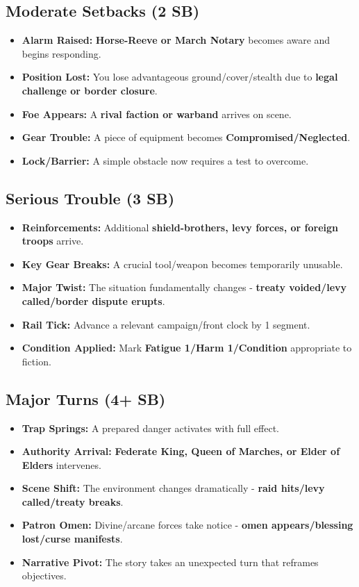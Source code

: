 \subsection*{Moderate Setbacks (2 SB)}
\begin{itemize}
\item \textbf{Alarm Raised:} \textbf{Horse-Reeve or March Notary} becomes aware and begins responding.
\item \textbf{Position Lost:} You lose advantageous ground/cover/stealth due to \textbf{legal challenge or border closure}.
\item \textbf{Foe Appears:} A \textbf{rival faction or warband} arrives on scene.
\item \textbf{Gear Trouble:} A piece of equipment becomes \textbf{Compromised/Neglected}.
\item \textbf{Lock/Barrier:} A simple obstacle now requires a test to overcome.
\end{itemize}

\subsection*{Serious Trouble (3 SB)}
\begin{itemize}
\item \textbf{Reinforcements:} Additional \textbf{shield-brothers, levy forces, or foreign troops} arrive.
\item \textbf{Key Gear Breaks:} A crucial tool/weapon becomes temporarily unusable.
\item \textbf{Major Twist:} The situation fundamentally changes - \textbf{treaty voided/levy called/border dispute erupts}.
\item \textbf{Rail Tick:} Advance a relevant campaign/front clock by 1 segment.
\item \textbf{Condition Applied:} Mark \textbf{Fatigue 1/Harm 1/Condition} appropriate to fiction.
\end{itemize}

\subsection*{Major Turns (4+ SB)}
\begin{itemize}
\item \textbf{Trap Springs:} A prepared danger activates with full effect.
\item \textbf{Authority Arrival:} \textbf{Federate King, Queen of Marches, or Elder of Elders} intervenes.
\item \textbf{Scene Shift:} The environment changes dramatically - \textbf{raid hits/levy called/treaty breaks}.
\item \textbf{Patron Omen:} Divine/arcane forces take notice - \textbf{omen appears/blessing lost/curse manifests}.
\item \textbf{Narrative Pivot:} The story takes an unexpected turn that reframes objectives.
\end{itemize}

